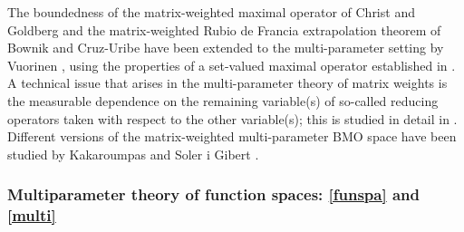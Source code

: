 \documentclass[11pt, reqno]{amsart}
\theoremstyle{definition}
\theoremstyle{remark}
\numberwithin{equation}{section}
\begin{document}
The boundedness of the matrix-weighted maximal operator of Christ and Goldberg \cite{CG01,Gold03} and the matrix-weighted Rubio de Francia extrapolation theorem of Bownik and Cruz-Uribe \cite{BCU} have been extended to the multi-parameter setting by Vuorinen \cite{Vuo24}, using the properties of a set-valued maximal operator established in \cite{BCU}. A technical issue that arises in the multi-parameter theory of matrix weights is the measurable dependence on the remaining variable(s) of so-called reducing operators taken with respect to the other variable(s); this is studied in detail in \cite{BCU,DKPS}.
Different versions of the matrix-weighted multi-parameter BMO space have been studied by Kakaroumpas and Soler i Gibert \cite{KS1,KS2}.

\subsubsection*{Multiparameter theory of function spaces: \eqref{funspa} and \eqref{multi}}
\end{document}
